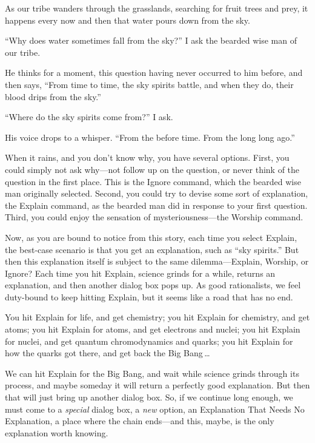{
 As our tribe wanders through the grasslands, searching for fruit
trees and prey, it happens every now and then that water pours down
from the sky. }

{
 ``Why does water sometimes fall from the
sky?'' I ask the bearded wise man of our tribe.}

{
 He thinks for a moment, this question having never occurred to him
before, and then says, ``From time to time, the sky
spirits battle, and when they do, their blood drips from the
sky.''}

{
 ``Where do the sky spirits come
from?'' I ask.}

{
 His voice drops to a whisper. ``From the before
time. From the long long ago.''}

{
 When it rains, and you don't know why, you have
several options. First, you could simply not ask why---not follow up on
the question, or never think of the question in the first place. This
is the Ignore command, which the bearded wise man originally selected.
Second, you could try to devise some sort of explanation, the Explain
command, as the bearded man did in response to your first question.
Third, you could enjoy the sensation of mysteriousness---the Worship
command.}

{
 Now, as you are bound to notice from this story, each time you
select Explain, the best-case scenario is that you get an explanation,
such as ``sky spirits.'' But then
this explanation itself is subject to the same dilemma---Explain,
Worship, or Ignore? Each time you hit Explain, science grinds for a
while, returns an explanation, and then another dialog box pops up. As
good rationalists, we feel duty-bound to keep hitting Explain, but it
seems like a road that has no end.}

{
 You hit Explain for life, and get chemistry; you hit Explain for
chemistry, and get atoms; you hit Explain for atoms, and get electrons
and nuclei; you hit Explain for nuclei, and get quantum chromodynamics
and quarks; you hit Explain for how the quarks got there, and get back
the Big Bang\,\ldots}

{
 We can hit Explain for the Big Bang, and wait while science grinds
through its process, and maybe someday it will return a perfectly good
explanation. But then that will just bring up another dialog box. So,
if we continue long enough, we must come to a \textit{special} dialog
box, a \textit{new} option, an Explanation That Needs No Explanation, a
place where the chain ends---and this, maybe, is the only explanation
worth knowing.}

